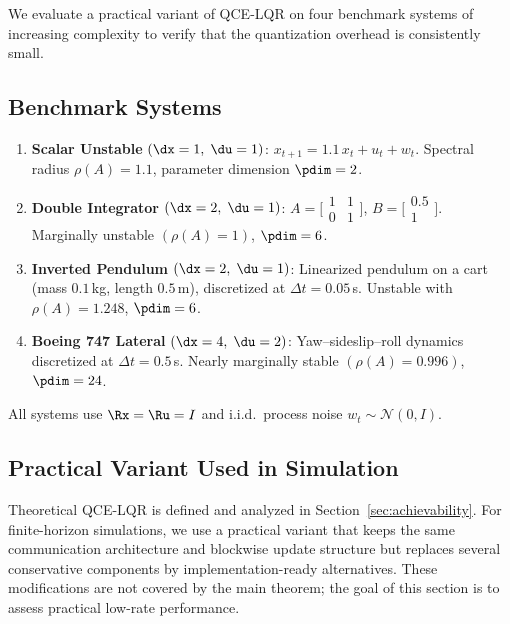 \documentclass[11pt,journal,onecolumn]{IEEEtran}
\begin{document}
We evaluate a practical variant of QCE-LQR on four benchmark systems of increasing complexity to verify that the quantization overhead is consistently small.

\subsection{Benchmark Systems}

\begin{enumerate}[leftmargin=*,itemsep=4pt]
    \item \textbf{Scalar Unstable} $(\dx=1,\;\du=1)$: $x_{t+1} = 1.1\,x_t + u_t + w_t$. Spectral radius $\rho(A) = 1.1$, parameter dimension $\pdim = 2$.

    \item \textbf{Double Integrator} $(\dx=2,\;\du=1)$: $A = \bigl[\begin{smallmatrix} 1 & 1 \\ 0 & 1 \end{smallmatrix}\bigr]$, $B = \bigl[\begin{smallmatrix} 0.5 \\ 1 \end{smallmatrix}\bigr]$. Marginally unstable $(\rho(A) = 1)$, $\pdim = 6$.

    \item \textbf{Inverted Pendulum} $(\dx=2,\;\du=1)$: Linearized pendulum on a cart (mass $0.1$\,kg, length $0.5$\,m), discretized at $\Delta t = 0.05$\,s. Unstable with $\rho(A) = 1.248$, $\pdim = 6$.

    \item \textbf{Boeing 747 Lateral} $(\dx=4,\;\du=2)$: Yaw--sideslip--roll dynamics~\cite{friedland_control} discretized at $\Delta t = 0.5$\,s. Nearly marginally stable $(\rho(A) = 0.996)$, $\pdim = 24$.
\end{enumerate}

All systems use $\Rx = \Ru = I$ and i.i.d.\ process noise $w_t \sim \mathcal{N}(0,I)$.

\subsection{Practical Variant Used in Simulation}

Theoretical QCE-LQR is defined and analyzed in Section~\ref{sec:achievability}. For finite-horizon simulations, we use a practical variant that keeps the same communication architecture and blockwise update structure but replaces several conservative components by implementation-ready alternatives. These modifications are not covered by the main theorem; the goal of this section is to assess practical low-rate performance.
\end{document}
